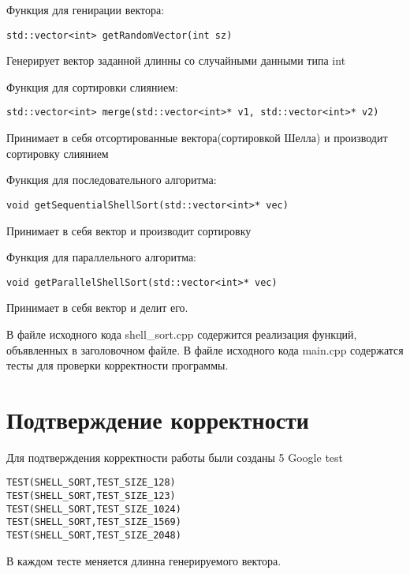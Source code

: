 \documentclass{report}
\begin{document}
\par Функция для генирации вектора:
\begin{lstlisting}
std::vector<int> getRandomVector(int sz)
\end{lstlisting}
 Генерирует вектор заданной длинны со случайными данными типа int
 
 \par Функция для сортировки слиянием:
\begin{lstlisting}
std::vector<int> merge(std::vector<int>* v1, std::vector<int>* v2)
\end{lstlisting}
 Принимает в себя отсортированные вектора(сортировкой Шелла) и производит сортировку слиянием

\par Функция для последовательного алгоритма:
\begin{lstlisting}
void getSequentialShellSort(std::vector<int>* vec)
\end{lstlisting}
 Принимает в себя вектор и производит сортировку

\par Функция для параллельного
алгоритма:
\begin{lstlisting}
void getParallelShellSort(std::vector<int>* vec)
\end{lstlisting}
Принимает в себя вектор и делит его.
\par В файле исходного кода shell\_sort.cpp содержится реализация функций, объявленных в заголовочном файле. В файле исходного кода main.cpp содержатся тесты для проверки корректности программы.
\newpage
\section*{Подтверждение корректности}
Для подтверждения корректности работы были созданы 5 Google test
\begin{alltt}
TEST(SHELL_SORT, TEST_SIZE_128) {}
TEST(SHELL_SORT, TEST_SIZE_123) {}
TEST(SHELL_SORT, TEST_SIZE_1024) {}
TEST(SHELL_SORT, TEST_SIZE_1569) {}
TEST(SHELL_SORT, TEST_SIZE_2048) {}
\end{alltt}
В каждом тесте меняется длинна генерируемого вектора.
\newpage
\end{document}
